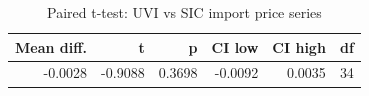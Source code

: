 \begin{table}

\caption{Paired t-test: UVI vs SIC import price series}
\centering
\begin{tabular}[t]{rrrrrr}
\toprule
Mean diff. & t & p & CI low & CI high & df\\
\midrule
-0.0028 & -0.9088 & 0.3698 & -0.0092 & 0.0035 & 34\\
\bottomrule
\end{tabular}
\end{table}
